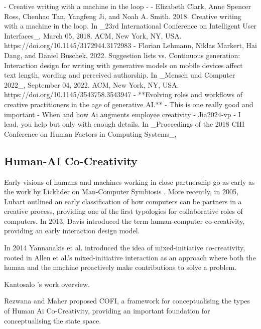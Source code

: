 			- \cite{Clark2018-yf} Creative writing with a machine in the loop
				- 
				- Elizabeth Clark, Anne Spencer Ross, Chenhao Tan, Yangfeng Ji, and Noah A. Smith. 2018. Creative writing with a machine in the loop. In _23rd International Conference on Intelligent User Interfaces_, March 05, 2018. ACM, New York, NY, USA. https://doi.org/10.1145/3172944.3172983
			- \cite{Lehmann2022-kr}Florian Lehmann, Niklas Markert, Hai Dang, and Daniel Buschek. 2022. Suggestion lists vs. Continuous generation: Interaction design for writing with generative models on mobile devices affect text length, wording and perceived authorship. In _Mensch und Computer 2022_, September 04, 2022. ACM, New York, NY, USA. https://doi.org/10.1145/3543758.3543947
			- **Evolving roles and workflows of creative practitioners in the age of generative AI.** \cite{Palani2024-on}
				- This is one really good and important
			- When and how Ai augments employee creativity
				- Jia2024-vp
			- \cite{Oh2018-mu} I lead, you help but only with enough details. In _Proceedings of the 2018 CHI Conference on Human Factors in Computing Systems_,








\subsection{Human-AI Co-Creativity}

Early visions of humans and machines working in close partnership go as early as the work by Licklider on Man-Computer Symbiosis \cite{Licklider1960-md}. More recently, in 2005, Lubart \cite{Lubart2005-zi} outlined an early classification of how computers can be partners in a creative process, providing one of the first typologies for collaborative roles of computers. In 2013, Davis \cite{Davis2013-jy} introduced the term human-computer co-creativity, providing an early interaction design model. 

In 2014 Yannanakis et al. \cite{Yannakakis2014-zs} introduced the idea of mixed-initiative co-creativity, rooted in Allen et al.'s \cite{Allen1999-sr} mixed-initiative interaction as an approach where both the human and the machine proactively make contributions to solve a problem. 

Kantosalo \cite{Kantosalo2015-pk} 's work overview. 

Rezwana and Maher proposed COFI, a framework for conceptualising the types of Human Ai Co-Creativity, providing an important foundation for conceptualising the state space. 

